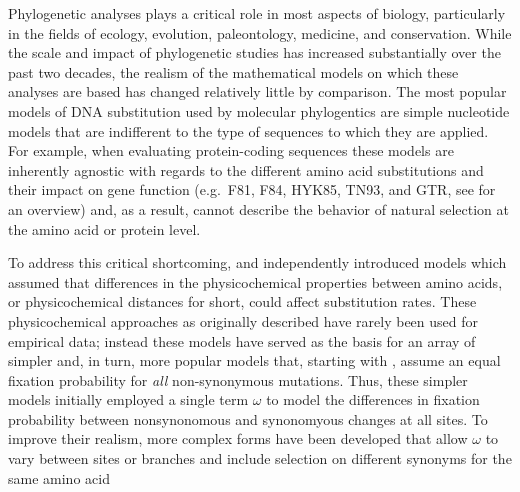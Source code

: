 \documentclass[12pt,letterpaper,fleqn]{article}
\renewcommand{\subsection}[1]{%
\bigskip
\begin{center}
\begin{large}
\normalfont\itshape #1
\end{large}
\end{center}}
\newcommand{\PC}{physicochemical\xspace}
\begin{document}
Phylogenetic analyses plays a critical role in most aspects of biology, particularly in the fields of ecology, evolution, paleontology, medicine, and conservation.
While the scale and impact of phylogenetic studies has increased substantially over the past two decades, the realism of the mathematical models on which these analyses are based has changed relatively little by comparison.
The most popular models of DNA substitution used by molecular phylogentics are simple nucleotide models that are indifferent to the type of sequences to which they are applied.
For example, when evaluating protein-coding sequences these models are inherently agnostic with regards to the different amino acid substitutions and their impact on gene function (e.g.~F81, F84, HYK85, TN93, and GTR, see \citet{Yang2014} for an overview) and, as a result, cannot describe the behavior of natural selection at the amino acid or protein level.

To address this critical shortcoming, \citet{GoldmanAndYang1994} and \citet{MuseAndGaut1994} independently introduced models which assumed that differences in the \PC properties between amino acids, or \PC distances for short, could affect substitution rates. 
These \PC approaches as originally described have rarely been used for empirical data; instead these models have served as the basis for an array of simpler and, in turn, more popular models that, starting with \citet{YangAndNielsen1998,NielsenAndYang1998}, assume an equal fixation probability for \emph{all} non-synonymous mutations.
Thus, these simpler models initially employed a single term $\omega$ to model the differences in fixation probability between nonsynonomous and synonomyous changes at all sites.
To improve their realism, more complex forms have been developed that allow $\omega$ to vary between sites or branches \citep[as cited in ][]{Anisimova2012} and include selection on different synonyms for the same amino acid \cite[e.g.][]{YangAndNielsen2008} %
\end{document}
